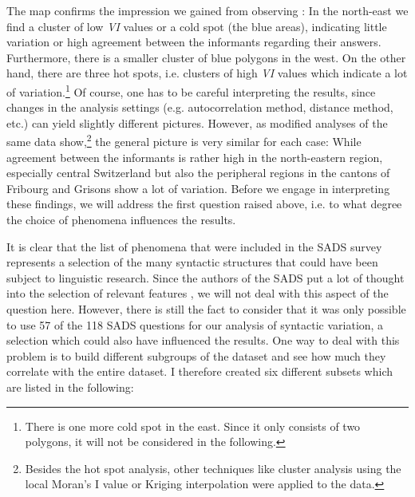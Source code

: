 \documentclass[output=paper]{LSP/langsci}
\begin{document}
The map confirms the impression we gained from observing : In the north-east we find a cluster of low \emph{VI} values or a cold spot (the blue areas), indicating little variation or high agreement between the informants regarding their answers. Furthermore, there is a smaller cluster of blue polygons in the west. On the other hand, there are three hot spots, i.e. clusters of high \emph{VI} values which indicate a lot of variation.\footnote{There is one more cold spot in the east. Since it only consists of two polygons, it will not be considered in the following.} Of course, one has to be careful interpreting the results, since changes in the analysis settings (e.g. autocorrelation method, distance method, etc.) can yield slightly different pictures. However, as modified analyses of the same data show,\footnote{ Besides the hot spot analysis, other techniques like cluster analysis using the local Moran’s I value or Kriging interpolation were applied to the data.} the general picture is very similar for each case: While agreement between the informants is rather high in the north-eastern region, especially central Switzerland but also the peripheral regions in the cantons of Fribourg and Grisons show a lot of variation. Before we engage in interpreting these findings, we will address the first question raised above, i.e. to what degree the choice of phenomena influences the results.

It is clear that the list of phenomena that were included in the SADS survey represents a selection of the many syntactic structures that could have been subject to linguistic research. Since the authors of the SADS put a lot of thought into the selection of relevant features \citep{bucheli_syntactic_2002}, we will not deal with this aspect of the question here. However, there is still the fact to consider that it was only possible to use 57 of the 118 SADS questions for our analysis of syntactic variation, a selection which could also have influenced the results. One way to deal with this problem is to build different subgroups of the dataset and see how much they correlate with the entire dataset. I therefore created six different subsets which are listed in the following:
\end{document}
